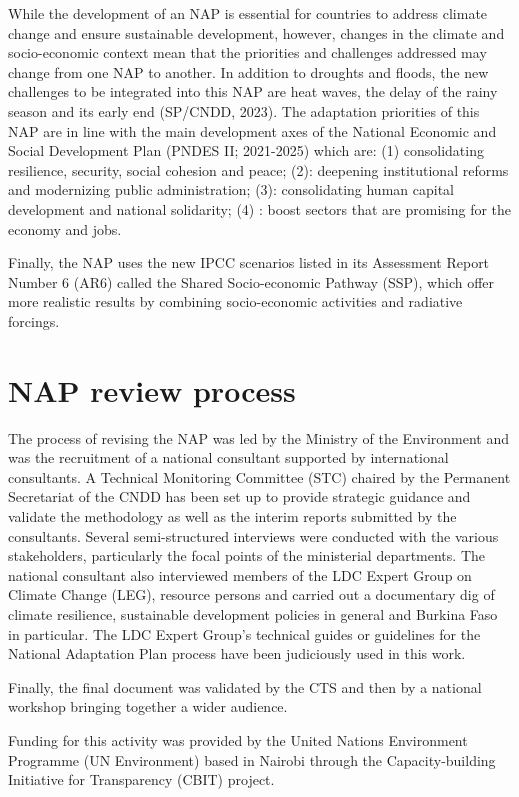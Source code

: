 \documentclass[
]{book}
\begin{document}
While the development of an NAP is essential for countries to address climate change and ensure sustainable development, however, changes in the climate and socio-economic context mean that the priorities and challenges addressed may change from one NAP to another. In addition to droughts and floods, the new challenges to be integrated into this NAP are heat waves, the delay of the rainy season and its early end (SP/CNDD, 2023). The adaptation priorities of this NAP are in line with the main development axes of the National Economic and Social Development Plan (PNDES II; 2021-2025) which are: (1) consolidating resilience, security, social cohesion and peace; (2): deepening institutional reforms and modernizing public administration; (3): consolidating human capital development and national solidarity; (4) : boost sectors that are promising for the economy and jobs.

Finally, the NAP uses the new IPCC scenarios listed in its Assessment Report Number 6 (AR6) called the Shared Socio-economic Pathway (SSP), which offer more realistic results by combining socio-economic activities and radiative forcings.

\section{NAP review process}\label{nap-review-process}

The process of revising the NAP was led by the Ministry of the Environment and was the recruitment of a national consultant supported by international consultants. A Technical Monitoring Committee (STC) chaired by the Permanent Secretariat of the CNDD has been set up to provide strategic guidance and validate the methodology as well as the interim reports submitted by the consultants. Several semi-structured interviews were conducted with the various stakeholders, particularly the focal points of the ministerial departments. The national consultant also interviewed members of the LDC Expert Group on Climate Change (LEG), resource persons and carried out a documentary dig of climate resilience, sustainable development policies in general and Burkina Faso in particular. The LDC Expert Group's technical guides or guidelines for the National Adaptation Plan process have been judiciously used in this work.

Finally, the final document was validated by the CTS and then by a national workshop bringing together a wider audience.

Funding for this activity was provided by the United Nations Environment Programme (UN Environment) based in Nairobi through the Capacity-building Initiative for Transparency (CBIT) project.
\end{document}
